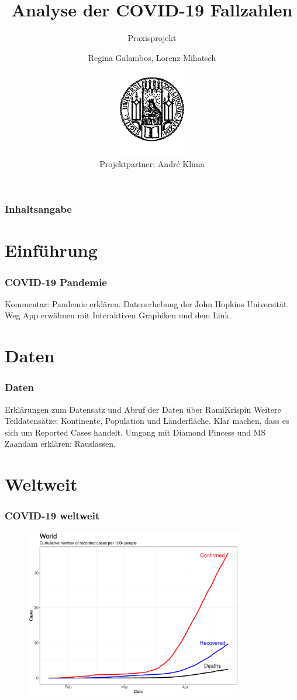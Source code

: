\documentclass{beamer}
\title[Praxisprojekt: COVID-19]{Analyse der COVID-19 Fallzahlen}
\subtitle{Praxisprojekt}
\author[R.Galambos, L.Mihatsch]{Regina Galambos, Lorenz Mihatsch\\
	\includegraphics[width=0.22\textwidth]{LMU.pdf}\\
	{\small Projektpartner: Andr\'{e} Klima}}
\begin{document}
\begin{frame}
	\titlepage
\end{frame}

\begin{frame}
   \frametitle{Inhaltsangabe}
   \tableofcontents
 \end{frame}
 
 
 \section{Einführung}
 \begin{frame}
 	\frametitle{COVID-19 Pandemie}
	Kommentar: Pandemie erklären. Datenerhebung der John Hopkins Universität.
	Weg App erwähnen mit Interaktiven Graphiken und dem Link.
 \end{frame}
 \section{Daten}
  
 \begin{frame}
 	\frametitle{Daten}
	Erklärungen zum Datensatz und Abruf der Daten über RamiKrispin
	Weitere Teildatensätze: Kontinente, Population und Länderfläche.
	Klar machen, dass es sich um Reported Cases handelt.
	Umgang mit Diamond Pincess und MS Zaandam erklären: Rauslassen.
 \end{frame}
 
 \section{Weltweit}
 \begin{frame}
 	\frametitle{COVID-19 weltweit}
	\begin{figure}
		\centering
		\includegraphics[width = 270pt]{Cases_world.pdf}
	\end{figure}
 \end{frame}
\end{document}
